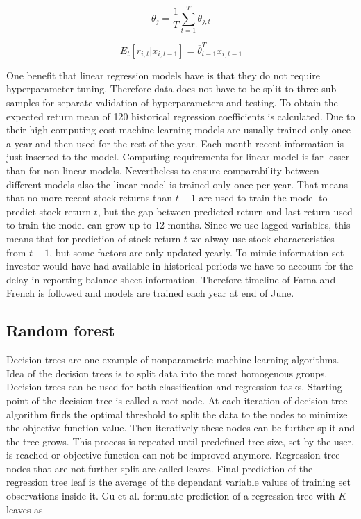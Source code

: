 \documentclass{article}
\begin{document}
\begin{equation}
\overline \theta_j = \frac{1}{T} \sum^{T}_{t=1}\theta_{j, t}
\end{equation}

\begin{equation}
E_t \left[ r_{i, t} | x_{i, t-1} \right] = \overline \theta_{t-1}^T x_{i, t-1}
\end{equation}

One benefit that linear regression models have is that they do not require hyperparameter tuning. Therefore data  does not have to be split to three sub-samples for separate validation of hyperparameters and testing. To obtain the expected return mean of 120 historical regression coefficients is calculated. Due to their high computing cost machine learning models are usually trained only once a year and then used for the rest of the year. Each month recent information is just inserted to the model. Computing requirements for linear model is far lesser than for non-linear models. Nevertheless to ensure comparability between different models also the linear model is trained only once per year. That means that no more recent stock returns than $t-1$ are used to train the model to predict stock return $t$, but the gap between predicted return and last return used to train the model can grow up to 12 months. Since we use lagged variables, this means that for prediction of stock return $t$ we alway use stock characteristics from $t-1$, but some factors are only updated yearly. To mimic information set investor would have had available in historical periods we have to account for the delay in reporting balance sheet information. Therefore timeline of Fama and French \citeyear{FAMA19933} is followed and models are trained each year at end of June. 

\subsection{Random forest}
Decision trees are one example of nonparametric machine learning algorithms. Idea of the decision trees is to split data into the most homogenous groups. Decision trees can be used for both classification and regression tasks. Starting point of the decision tree is called a root node. At each iteration of decision tree algorithm finds the optimal threshold to split the data to the nodes to minimize the objective function value. %
Then iteratively these nodes can be further split and the tree grows. This process is repeated until predefined tree size, set by the user, is reached or objective function can not be improved anymore. Regression tree nodes that are not further split are called leaves. Final prediction of the regression tree leaf is the average of the dependant variable values of training set observations inside it. Gu et al. \citeyear{guetal} formulate prediction of a regression tree with $K$ leaves as 
\end{document}
